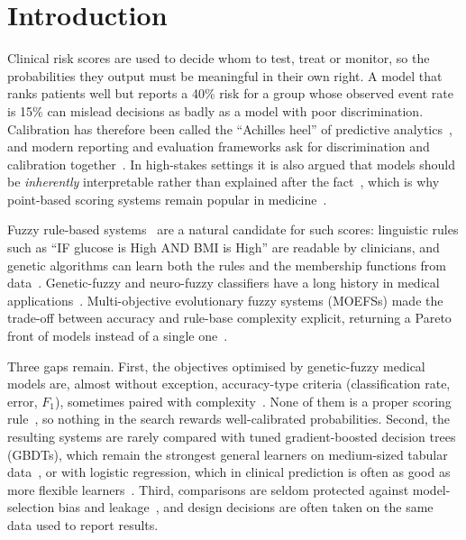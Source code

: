 \section{Introduction}
\label{sec:intro}

Clinical risk scores are used to decide whom to test, treat or monitor, so the
probabilities they output must be meaningful in their own right. A model that ranks
patients well but reports a 40\% risk for a group whose observed event rate is 15\%
can mislead decisions as badly as a model with poor discrimination. Calibration has
therefore been called the ``Achilles heel'' of predictive analytics~\cite{vancalster2019},
and modern reporting and evaluation frameworks ask for discrimination and calibration
together~\cite{steyerberg2010,collins2015,vancalster2016,huang2020}. In high-stakes
settings it is also argued that models should be \emph{inherently} interpretable rather
than explained after the fact~\cite{rudin2019}, which is why point-based scoring
systems remain popular in medicine~\cite{ustun2016}.

Fuzzy rule-based systems~\cite{zadeh1965,mamdani1975,takagi1985} are a natural
candidate for such scores: linguistic rules such as ``IF glucose is High AND BMI is
High'' are readable by clinicians, and genetic algorithms can learn both the rules and
the membership functions from data~\cite{herrera2008,fernandez2019}. Genetic-fuzzy and
neuro-fuzzy classifiers have a long history in medical
applications~\cite{penareyes1999,nauck1999,kahramanli2008,anooj2012,seera2014,pota2017}.
Multi-objective evolutionary fuzzy systems (MOEFSs) made the trade-off between
accuracy and rule-base complexity explicit, returning a Pareto front of models instead
of a single one~\cite{ishibuchi1997,ishibuchi2007,alcala2009,antonelli2011,fazzolari2013,gorzalczany2017}.

Three gaps remain. First, the objectives optimised by genetic-fuzzy medical models are,
almost without exception, accuracy-type criteria (classification rate, error, $F_1$),
sometimes paired with complexity~\cite{fazzolari2013,gacto2011}. None of them is a
proper scoring rule~\cite{gneiting2007}, so nothing in the search rewards
well-calibrated probabilities. Second, the resulting systems are rarely compared with
tuned gradient-boosted decision trees (GBDTs), which remain the strongest general
learners on medium-sized tabular data~\cite{grinsztajn2022,shwartzziv2022}, or with
logistic regression, which in clinical prediction is often as good as more flexible
learners~\cite{christodoulou2019}. Third, comparisons are seldom protected against
model-selection bias and leakage~\cite{cawley2010,kaufman2012}, and design decisions
are often taken on the same data used to report results.

